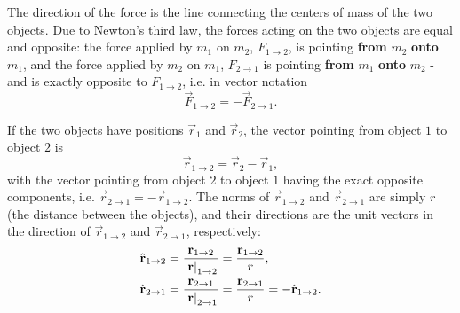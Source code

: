 The direction of the force is the line connecting the centers of mass of the two objects. Due to Newton's third law, the forces acting on the two objects are equal and opposite: the force applied by $m_{1}$ on $m_{2}$, $F_{1\to2}$, is pointing \textbf{from} $m_{2}$ \textbf{onto} $m_{1}$, and the force applied by $m_{2}$ on $m_{1}$, $F_{2\to1}$ is pointing \textbf{from} $m_{1}$ \textbf{onto} $m_{2}$ - and is exactly opposite to $F_{1\to2}$, i.e. in vector notation
\begin{equation}
	\vec{F}_{1\to2} = -\vec{F}_{2\to1}.
	\label{eq:gravity_force_vector_directions}
\end{equation}

If the two objects have positions $\vec{r}_{1}$ and $\vec{r}_{2}$, the vector pointing from object $1$ to object $2$ is
\begin{equation}
	\vec{r}_{1\to2} = \vec{r}_{2} - \vec{r}_{1},
	\label{eq:position_vector}
\end{equation}
with the vector pointing from object $2$ to object $1$ having the exact opposite components, i.e. $\vec{r}_{2\to1}=-\vec{r}_{1\to2}$. The norms of $\vec{r}_{1\to2}$ and $\vec{r}_{2\to1}$ are simply $r$ (the distance between the objects), and their directions are the unit vectors in the direction of $\vec{r}_{1\to2}$ and $\vec{r}_{2\to1}$, respectively:
\begin{align}
	\hat{\mathbf{r}}_{1\to2} & = \frac{\mathbf{r}_{1\to2}}{\left| \mathbf{r} \right|_{1\to2}} = \frac{\mathbf{r}_{1\to2}}{r}\nonumber,            \\
	\hat{\mathbf{r}}_{2\to1} & = \frac{\mathbf{r}_{2\to1}}{\left| \mathbf{r} \right|_{2\to1}} = \frac{\mathbf{r}_{2\to1}}{r} = -\hat{\mathbf{r}}_{1\to2}.
	\label{eq:normed_position_vector}
\end{align}

